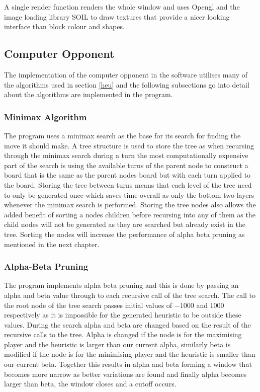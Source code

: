 \documentclass[final]{cmpreport}
\begin{document}
A single render function renders the whole window and uses Opengl and the image loading library SOIL \citet{lonesock77:online} to draw textures that provide a nicer looking interface than block colour and shapes.
\subsection{Computer Opponent}
The implementation of the computer opponent in the software utilises many of the algorithms used in section \ref{heu} and the following subsections go into detail about the algorithms are implemented in the program.
\subsubsection{Minimax Algorithm}
The program uses a minimax search as the base for its search for finding the move it should make. A tree structure is used to store the tree as when recursing through the minimax search during a turn the most computationally expensive part of the search is using the available turns of the parent node to construct a board that is the same as the parent nodes board but with each turn applied to the board. Storing the tree between turns means that each level of the tree need to only be generated once which saves time overall as only the bottom two layers whenever the minimax search is performed. Storing the tree nodes also allows the added benefit of sorting a nodes children before recursing into any of them as the child nodes will not be generated as they are searched but already exist in the tree. Sorting the nodes will increase the performance of alpha beta pruning as mentioned in the next chapter. 
\subsubsection{Alpha-Beta Pruning}
The program implements alpha beta pruning and this is done by passing an alpha and beta value through to each recursive call of the tree search. The call to the root node of the tree search passes initial values of $-1000$ and 1000 respectively as it is impossible for the generated heuristic to be outside these values. During the search alpha and beta are changed based on the result of the recursive calls to the tree. Alpha is changed if the node is for the maximising player and the heuristic is larger than our current alpha, similarly beta is modified if the node is for the minimising player and the heuristic is smaller than our current beta. Together this results in alpha and beta forming a window that becomes more narrow as better variations are found and finally alpha becomes larger than beta, the window closes and a cutoff occurs.
\end{document}
